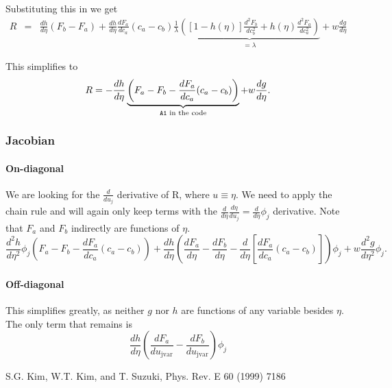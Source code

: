 \documentclass[]{article}
\begin{document}
Substituting this in we get
\begin{eqnarray*}
R &=& \frac{dh}{d\eta}(F_b-F_a) + \frac{dh}{d\eta}\frac{dF_a}{dc_a}(c_a-c_b)\frac1\lambda\underbrace{\left([1-h(\eta)] \frac{d^2F_b}{dc_b^2} + h(\eta)\frac{d^2F_a}{dc_a^2}\right)}_{=\lambda} +w\frac{dg}{d\eta}
\end{eqnarray*}

This simplifies to
\[
R=-\frac{dh}{d\eta}\underbrace{\left(F_a-F_b-\frac{dF_a}{dc_a}(c_a-c_b)\right)}_{\text{\texttt{A1} in the code}}+w\frac{dg}{d\eta}.
\]

\subsubsection{Jacobian}

\paragraph{On-diagonal}
We are looking for the $\frac d{du_j}$ derivative of R, where $u\equiv\eta$. We need to apply the chain rule and will again only keep terms with the $\frac{d}{d\eta}\frac{d\eta}{du_j}=\frac{d}{d\eta}\phi_j$ derivative. Note that $F_a$ and $F_b$ indirectly are functions of $\eta$.
\[
\frac{d^2h}{d\eta^2}\phi_j(F_a-F_b-\frac{dF_a}{dc_a}(c_a-c_b)) + \frac{dh}{d\eta}\left(\frac{dF_a}{d\eta}-\frac{dF_b}{d\eta}-\frac{d}{d\eta}\left[ \frac{dF_a}{dc_a}(c_a-c_b)\right]\right)\phi_j + w\frac{d^2g}{d\eta^2}\phi_j.
\]

\paragraph{Off-diagonal}
This simplifies greatly, as neither $g$ nor $h$ are functions of any variable besides $\eta$. The only term that remains is
\[
\frac{dh}{d\eta}\left(\frac{dF_a}{du_\text{jvar}}-\frac{dF_b}{du_\text{jvar}}\right)\phi_j
\] 


\begin{thebibliography}{9}
 S.G. Kim, W.T. Kim, and T. Suzuki, Phys. Rev. E 60 (1999) 7186
\end{thebibliography}
\end{document}
